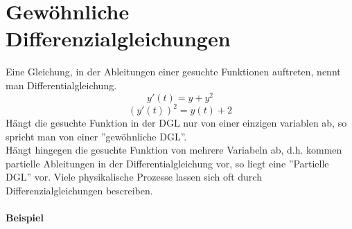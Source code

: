 \chapter{Gewöhnliche Differenzialgleichungen}
Eine Gleichung, in der Ableitungen einer gesuchte Funktionen auftreten, nennt man Differentialgleichung.
$$y'(t)=y+y^2$$
$$\left( y'(t)\right)^2=y(t)+2$$
Hängt die gesuchte Funktion in der DGL nur von einer einzigen variablen ab, so spricht man von einer ''gewöhnliche DGL''.\\

\noindent Hängt hingegen die gesuchte Funktion von mehrere Variabeln ab, d.h. kommen partielle Ableitungen in der Differentialgleichung vor, so liegt eine ''Partielle DGL'' vor. Viele physikalische Prozesse lassen sich oft durch Differenzialgleichungen bescreiben.
\subsubsection*{Beispiel}
